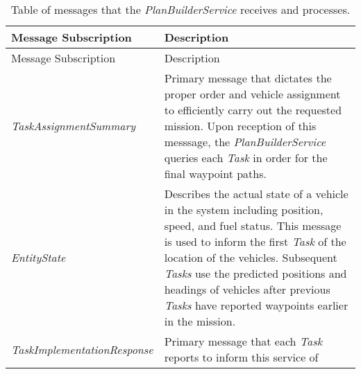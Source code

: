 \begin{longtable}[c]{@{}ll@{}}
\caption{Table of messages that the \emph{PlanBuilderService} receives
and processes.}\tabularnewline
\toprule
\begin{minipage}[b]{0.29\columnwidth}\raggedright\strut
Message Subscription
\strut\end{minipage} &
\begin{minipage}[b]{0.65\columnwidth}\raggedright\strut
Description
\strut\end{minipage}\tabularnewline
\midrule
\endfirsthead
\toprule
\begin{minipage}[b]{0.29\columnwidth}\raggedright\strut
Message Subscription
\strut\end{minipage} &
\begin{minipage}[b]{0.65\columnwidth}\raggedright\strut
Description
\strut\end{minipage}\tabularnewline
\midrule
\endhead
\begin{minipage}[t]{0.29\columnwidth}\raggedright\strut
\emph{TaskAssignmentSummary}
\strut\end{minipage} &
\begin{minipage}[t]{0.65\columnwidth}\raggedright\strut
Primary message that dictates the proper order and vehicle assignment to
efficiently carry out the requested mission. Upon reception of this
messsage, the \emph{PlanBuilderService} queries each \emph{Task} in
order for the final waypoint paths.
\strut\end{minipage}\tabularnewline
\begin{minipage}[t]{0.29\columnwidth}\raggedright\strut
\emph{EntityState}
\strut\end{minipage} &
\begin{minipage}[t]{0.65\columnwidth}\raggedright\strut
Describes the actual state of a vehicle in the system including
position, speed, and fuel status. This message is used to inform the
first \emph{Task} of the location of the vehicles. Subsequent
\emph{Tasks} use the predicted positions and headings of vehicles after
previous \emph{Tasks} have reported waypoints earlier in the mission.
\strut\end{minipage}\tabularnewline
\begin{minipage}[t]{0.29\columnwidth}\raggedright\strut
\emph{TaskImplementationResponse}
\strut\end{minipage} &
\begin{minipage}[t]{0.65\columnwidth}\raggedright\strut
Primary message that each \emph{Task} reports to inform this service of

\end{minipage}
\end{longtable}
